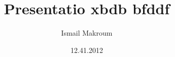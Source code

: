 \documentclass[ngerman]{beamer}
\author{Ismail Makroum}
\title{Presentatio xbdb bfddf}
\institute{Deutsches Zentrum für Luft- und Raumfahrt}
\date{12.41.2012}
\begin{document}
\begin{frame}
\maketitle
\end{frame}
\end{document}
